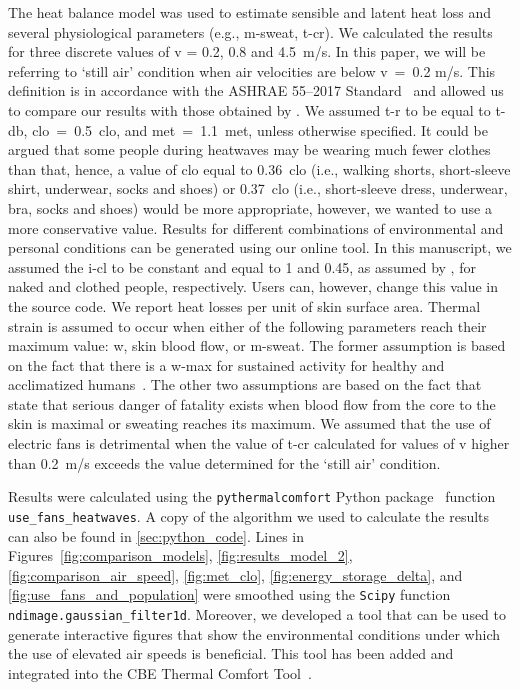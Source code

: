 The heat balance model was used to estimate sensible and latent heat loss and several physiological parameters (e.g., \ac{m-sweat}, \ac{t-cr}).
We calculated the results for three discrete values of \ac{v} = 0.2, 0.8 and 4.5~m/s.
In this paper, we will be referring to `still air' condition when air velocities are below \ac{v}~=~0.2 m/s.
This definition is in accordance with the ASHRAE 55--2017 Standard~\cite{ashrae552017} and allowed us to compare our results with those obtained by .
We assumed \ac{t-r} to be equal to \ac{t-db}, \ac{clo}~=~0.5~clo, and \ac{met}~=~1.1~met, unless otherwise specified.
It could be argued that some people during heatwaves may be wearing much fewer clothes than that, hence, a value of \ac{clo} equal to 0.36~clo (i.e., walking shorts, short-sleeve shirt, underwear, socks and shoes) or 0.37~clo (i.e., short-sleeve dress, underwear, bra, socks and shoes) would be more appropriate, however, we wanted to use a more conservative value.
Results for different combinations of environmental and personal conditions can be generated using our online tool.
In this manuscript, we assumed the \ac{i-cl} to be constant and equal to 1 and 0.45, as assumed by , for naked and clothed people, respectively.
Users can, however, change this value in the source code.
We report heat losses per unit of skin surface area.
Thermal strain is assumed to occur when either of the following parameters reach their maximum value: \ac{w}, skin blood flow, or \ac{m-sweat}.
The former assumption is based on the fact that there is a \ac{w-max} for sustained activity for healthy and acclimatized humans~\cite{ASHRA2017}.
The other two assumptions are based on the fact that  state that serious danger of fatality exists when blood flow from the core to the skin is maximal or sweating reaches its maximum.
We assumed that the use of electric fans is detrimental when the value of \ac{t-cr} calculated for values of \ac{v} higher than 0.2~m/s exceeds the value determined for the `still air' condition.

Results were calculated using the  \verb|pythermalcomfort| Python package~\cite{Tartarini2020a} function \verb|use_fans_heatwaves|.
A copy of the algorithm we used to calculate the results can also be found in \ref{sec:python_code}.
Lines in Figures~\ref{fig:comparison_models}, \ref{fig:results_model_2}, \ref{fig:comparison_air_speed}, \ref{fig:met_clo}, \ref{fig:energy_storage_delta}, and \ref{fig:use_fans_and_population} were smoothed using the \verb|Scipy| function \verb|ndimage.gaussian_filter1d|.
Moreover, we developed a tool that can be used to generate interactive figures that show the environmental conditions under which the use of elevated air speeds is beneficial.
This tool has been added and integrated into the CBE Thermal Comfort Tool~\cite{Tartarini2020}.

